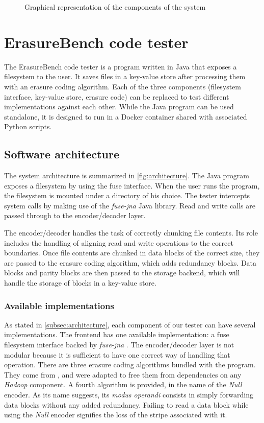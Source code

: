 \begin{figure}
    \centering
    
    \caption{Graphical representation of the components of the system}
    \label{fig:architecture}
\end{figure}

\section{ErasureBench code tester}

The ErasureBench code tester is a program written in Java that exposes a filesystem to the user.
It saves files in a key-value store after processing them with an erasure coding algorithm.
Each of the three components (filesystem interface, key-value store, erasure code) can be replaced to test different implementations against each other. While the Java program can be used standalone, it is designed to run in a Docker container shared with associated Python scripts.

\subsection{Software architecture}
\label{subsec:architecture}

The system architecture is summarized in \autoref{fig:architecture}. The Java program exposes a filesystem by using the \ac{fuse} interface. When the user runs the program, the filesystem is mounted under a directory of his choice. The tester intercepts system calls by making use of the \textit{fuse-jna} \autocite{fuse-jna} Java library. Read and write calls are passed through to the encoder/decoder layer.

The encoder/decoder handles the task of correctly chunking file contents.
Its role includes the handling of aligning read and write operations to the correct boundaries.
Once file contents are chunked in data blocks of the correct size, they are passed to the erasure coding algorithm, which adds redundancy blocks.
Data blocks and parity blocks are then passed to the storage backend, which will handle the storage of blocks in a key-value store.

\subsubsection{Available implementations}

As stated in \autoref{subsec:architecture}, each component of our tester can have several implementations.
The frontend has one available implementation: a \ac{fuse} filesystem interface backed by \textit{fuse-jna} \autocite{fuse-jna}.
The encoder/decoder layer is not modular because it is sufficient to have one correct way of handling that operation.
There are three erasure coding algorithms bundled with the program.
They come from \autocite{XorbasVLDB}, and were adapted to free them from dependencies on any \textit{Hadoop} component.
A fourth algorithm is provided, in the name of the \textit{Null} encoder.
As its name suggests, its \textit{modus operandi} consists in simply forwarding data blocks without any added redundancy.
Failing to read a data block while using the \textit{Null} encoder signifies the loss of the stripe associated with it.

